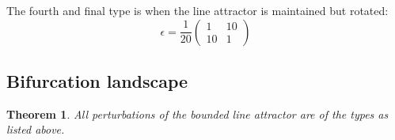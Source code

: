 \documentclass{article} %
\newcounter{ct}
\newtheorem{theorem}{Theorem}
\theoremstyle{definition}
\theoremstyle{remark}
\begin{document}
The fourth and final type is when the line attractor is maintained but rotated:
\begin{equation}
\epsilon =  \frac{1}{20}
\begin{pmatrix}
1 & 10\\
10 & 1
\end{pmatrix}
\end{equation}



\subsection{Bifurcation landscape}\label{sec:supp:bifurcationlandscape}
\begin{theorem}
All perturbations of the bounded line attractor are of the types as listed above.
\end{theorem}
\end{document}
